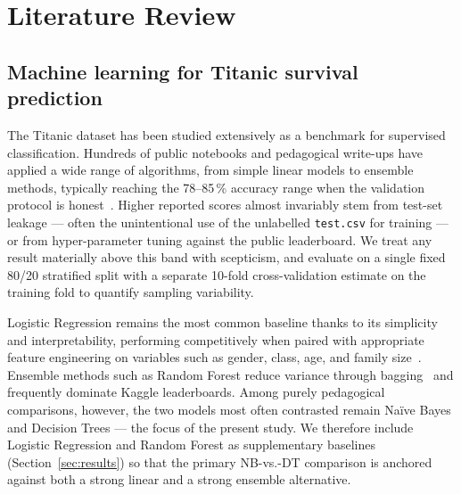 \documentclass[10pt,a4paper,twocolumn]{article}
\begin{document}
\section{Literature Review}\label{sec:litreview}

\subsection{Machine learning for Titanic survival prediction}
The Titanic dataset has been studied extensively as a benchmark for supervised
classification. Hundreds of public notebooks and pedagogical write-ups have applied a
wide range of algorithms, from simple linear models to ensemble methods, typically
reaching the 78--85\,\% accuracy range when the validation protocol is
honest~\cite{kaggle_titanic,hastie2009esl}. Higher reported scores almost invariably
stem from test-set leakage --- often the unintentional use of the unlabelled
\texttt{test.csv} for training --- or from hyper-parameter tuning against the public
leaderboard. We treat any result materially above this band with scepticism, and
evaluate on a single fixed 80/20 stratified split with a separate 10-fold
cross-validation estimate on the training fold to quantify sampling variability.

Logistic Regression remains the most common baseline thanks to its simplicity and
interpretability, performing competitively when paired with appropriate feature
engineering on variables such as gender, class, age, and family
size~\cite{pedregosa2011sklearn}. Ensemble methods such as Random Forest reduce variance
through bagging~\cite{breiman1984} and frequently dominate Kaggle leaderboards. Among
purely pedagogical comparisons, however, the two models most often contrasted remain
Na\"ive Bayes and Decision Trees --- the focus of the present study. We therefore
include Logistic Regression and Random Forest as supplementary baselines
(Section~\ref{sec:results}) so that the primary NB-vs.-DT comparison is anchored
against both a strong linear and a strong ensemble alternative.
\end{document}
